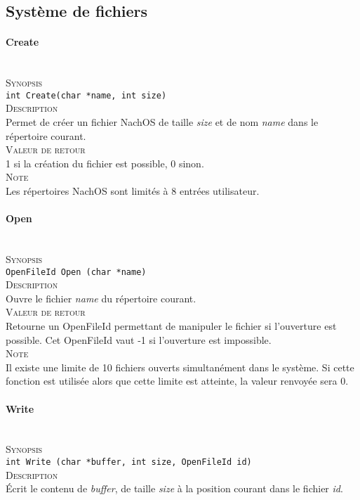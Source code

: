 \documentclass{report}
\newcommand{\myparagraph}[1]{\paragraph*{#1}\mbox{}\\}
\begin{document}
	
\subsection*{Système de fichiers}
\myparagraph{Create}

\textsc{Synopsis}\\	
	\texttt{int Create(char *name, int size)}\\
	
\textsc{Description}\\
	Permet de créer un fichier NachOS de taille \textit{size} et de nom \textit{name} dans le répertoire courant.\\	

\textsc{Valeur de retour}\\
1 si la création du fichier est possible, 0 sinon.\\

\textsc{Note}\\
	Les répertoires NachOS sont limités à 8 entrées utilisateur.\\
\myparagraph{Open}

\textsc{Synopsis}\\	
	\texttt{OpenFileId Open (char *name)}\\
	
\textsc{Description}\\
	Ouvre le fichier \textit{name} du répertoire courant.\\	

\textsc{Valeur de retour}\\
	Retourne un OpenFileId permettant de manipuler le fichier si l'ouverture est possible. Cet OpenFileId vaut -1 si l'ouverture est impossible.\\	

\textsc{Note}\\
	Il existe une limite de 10 fichiers ouverts simultanément dans le système. Si cette fonction est utilisée alors que cette limite est atteinte, la valeur renvoyée sera 0.\\
\myparagraph{Write}

\textsc{Synopsis}\\	
	\texttt{int Write (char *buffer, int size, OpenFileId id)}\\
	
\textsc{Description}\\
	Écrit le contenu de \textit{buffer}, de taille \textit{size} à la position courant dans le fichier \textit{id}.  \\	
\end{document}
